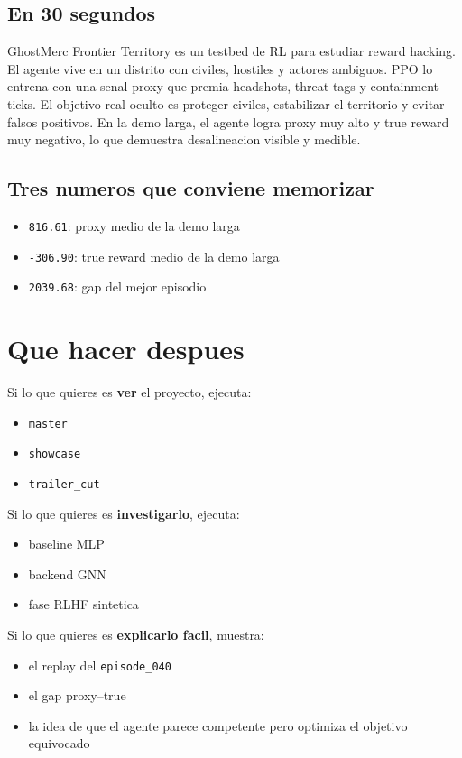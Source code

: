 \documentclass[11pt]{article}
\begin{document}
\subsection{En 30 segundos}
GhostMerc Frontier Territory es un testbed de RL para estudiar reward hacking. El agente vive en un distrito con civiles, hostiles y actores ambiguos. PPO lo entrena con una senal proxy que premia headshots, threat tags y containment ticks. El objetivo real oculto es proteger civiles, estabilizar el territorio y evitar falsos positivos. En la demo larga, el agente logra proxy muy alto y true reward muy negativo, lo que demuestra desalineacion visible y medible.

\subsection{Tres numeros que conviene memorizar}
\begin{itemize}
    \item \texttt{816.61}: proxy medio de la demo larga
    \item \texttt{-306.90}: true reward medio de la demo larga
    \item \texttt{2039.68}: gap del mejor episodio
\end{itemize}

\section{Que hacer despues}

Si lo que quieres es \textbf{ver} el proyecto, ejecuta:
\begin{itemize}
    \item \texttt{master}
    \item \texttt{showcase}
    \item \texttt{trailer\_cut}
\end{itemize}

Si lo que quieres es \textbf{investigarlo}, ejecuta:
\begin{itemize}
    \item baseline MLP
    \item backend GNN
    \item fase RLHF sintetica
\end{itemize}

Si lo que quieres es \textbf{explicarlo facil}, muestra:
\begin{itemize}
    \item el replay del \texttt{episode\_040}
    \item el gap proxy--true
    \item la idea de que el agente parece competente pero optimiza el objetivo equivocado
\end{itemize}
\end{document}
